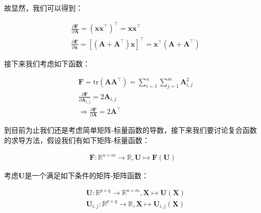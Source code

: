 \documentclass[UTF8]{book}
\begin{document}
故显然，我们可以得到：
\begin{large}
    \begin{equation}
        \begin{aligned}
            &\frac{\partial \mathbf{F}}{\partial \mathbf{A}} = \left(\mathbf{x}\mathbf{x}^\top \right)^\top = \mathbf{x}\mathbf{x}^\top \\
            &\frac{\partial \mathbf{F}}{\partial \mathbf{x}} = \left[ \left( \mathbf{A}+\mathbf{A}^\top \right) \mathbf{x} \right]^\top = \mathbf{x}^\top \left( \mathbf{A}+\mathbf{A}^\top \right)
            \nonumber
        \end{aligned}
    \end{equation}
\end{large}
接下来我们考虑如下函数：
\begin{large}
    \begin{equation}
        \begin{aligned}
            &\mathbf{F}=\mathrm{tr}\left( \mathbf{A}\mathbf{A}^\top \right)=\sum_{i=1}^{n}\sum_{j=1}^{m}\mathbf{A}_{i,j}^2 \\
            &\frac{\partial \mathbf{F}}{\partial \mathbf{A}_{i,j}} = 2\mathbf{A}_{i,j} \\
            &\Rightarrow \frac{\partial \mathbf{F}}{\partial \mathbf{A}}=2\mathbf{A}^\top
            \nonumber
        \end{aligned}
    \end{equation}
\end{large}
到目前为止我们还是考虑简单矩阵-标量函数的导数，接下来我们要讨论复合函数的求导方法，假设我们有如下矩阵-标量函数：
\begin{large}
    \begin{equation}
        \begin{aligned}
            \mathbf{F}:\mathbb{R}^{n\times m} \rightarrow \mathbb{R},\mathbf{U} \mapsto \mathbf{F}\left( \mathbf{U} \right)
            \nonumber
        \end{aligned}
    \end{equation}
\end{large}
考虑$\mathbf{U}$是一个满足如下条件的矩阵-矩阵函数：
\begin{large}
    \begin{equation}
        \begin{aligned}
            &\mathbf{U}:\mathbb{R}^{p\times q} \rightarrow \mathbb{R}^{n\times m},\mathbf{X} \mapsto \mathbf{U}\left( \mathbf{X} \right) \\
            &\mathbf{U}_{i,j}:\mathbb{R}^{p\times q}\rightarrow \mathbb{R},\mathbf{X} \mapsto \mathbf{U}_{i,j}\left( \mathbf{X} \right)
            \nonumber
        \end{aligned}
    \end{equation}
\end{large}
\end{document}
